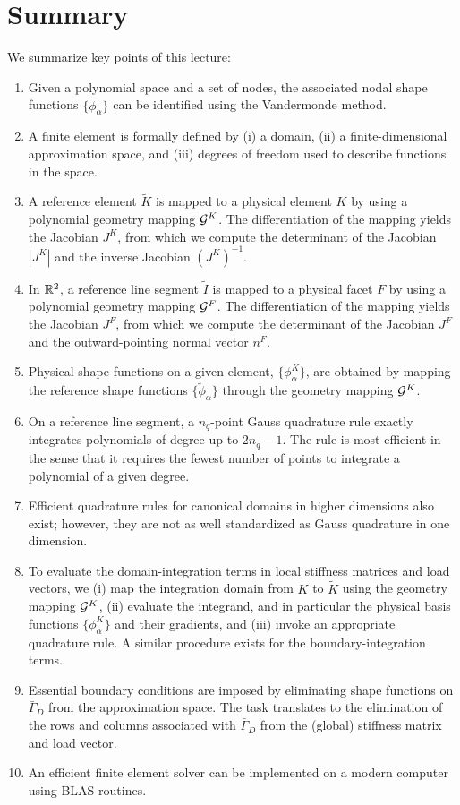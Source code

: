 \section{Summary}
We summarize key points of this lecture:
\begin{enumerate}
\item Given a polynomial space and a set of nodes, the associated nodal shape functions $\{\tilde \phi_\alpha\}$ can be identified using the Vandermonde method.
\item A finite element is formally defined by (i) a domain, (ii) a finite-dimensional approximation space, and (iii) degrees of freedom used to describe functions in the space.
\item A reference element $\tilde K$ is mapped to a physical element $K$ by using a polynomial geometry mapping $\mathcal{G}^K$.  The differentiation of the mapping yields the Jacobian $J^K$, from which we compute the determinant of the Jacobian $|J^K|$ and the inverse Jacobian $(J^K)^{-1}$.
\item In $\mathbb{R}^2$, a reference line segment $\tilde I$ is mapped to a physical facet $F$ by using a polynomial geometry mapping $\mathcal{G}^F$.  The differentiation of the mapping yields the Jacobian $J^F$, from which we compute the determinant of the Jacobian $J^F$ and the outward-pointing normal vector $n^F$.
\item Physical shape functions on a given element, $\{\phi^K_\alpha\}$, are obtained by mapping the reference shape functions $\{\tilde \phi_\alpha\}$ through the geometry mapping $\mathcal{G}^K$.
\item On a reference line segment, a $n_q$-point Gauss quadrature rule exactly integrates polynomials of degree up to $2n_q - 1$.  The rule is most efficient in the sense that it requires the fewest number of points to integrate a polynomial of a given degree.
\item Efficient quadrature rules for canonical domains in higher dimensions also exist; however, they are not as well standardized as Gauss quadrature in one dimension.
\item To evaluate the domain-integration terms in local stiffness matrices and load vectors, we (i) map the integration domain from $K$ to $\tilde K$ using the geometry mapping $\mathcal{G}^K$, (ii) evaluate the integrand, and in particular the physical basis functions $\{\phi_\alpha^K\}$ and their gradients, and (iii) invoke an appropriate quadrature rule.  A similar procedure exists for the boundary-integration terms.
\item Essential boundary conditions are imposed by eliminating shape functions on $\bar \Gamma_D$ from the approximation space. The task translates to the elimination of the rows and columns associated with $\bar \Gamma_D$ from the (global) stiffness matrix and load vector.
\item An efficient finite element solver can be implemented on a modern computer using BLAS routines.
\end{enumerate}

